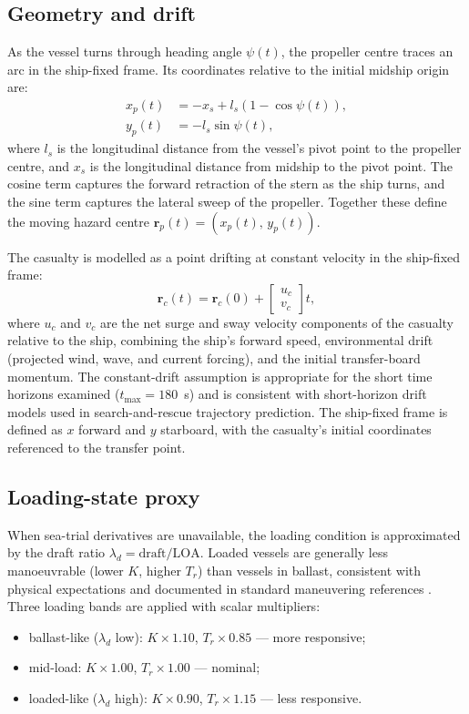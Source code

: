 \documentclass[preprint,12pt]{elsarticle}
\begin{document}
\subsection{Geometry and drift}
As the vessel turns through heading angle $\psi(t)$, the propeller centre traces an arc in the ship-fixed frame. Its coordinates relative to the initial midship origin are:
\begin{align}
 x_p(t) &= -x_s + l_s\left(1-\cos\psi(t)\right),\\
 y_p(t) &= -l_s\sin\psi(t),
\end{align}
where $l_s$ is the longitudinal distance from the vessel's pivot point to the propeller centre, and $x_s$ is the longitudinal distance from midship to the pivot point. The cosine term captures the forward retraction of the stern as the ship turns, and the sine term captures the lateral sweep of the propeller. Together these define the moving hazard centre $\mathbf{r}_p(t)=(x_p(t),\,y_p(t))$.

The casualty is modelled as a point drifting at constant velocity in the ship-fixed frame:
\begin{equation}
\mathbf{r}_c(t)=\mathbf{r}_c(0)+\begin{bmatrix}u_c\\v_c\end{bmatrix}t,
\end{equation}
where $u_c$ and $v_c$ are the net surge and sway velocity components of the casualty relative to the ship, combining the ship's forward speed, environmental drift (projected wind, wave, and current forcing), and the initial transfer-board momentum. The constant-drift assumption is appropriate for the short time horizons examined ($t_{\max}=180$~s) and is consistent with short-horizon drift models used in search-and-rescue trajectory prediction. The ship-fixed frame is defined as $x$ forward and $y$ starboard, with the casualty's initial coordinates referenced to the transfer point.

\subsection{Loading-state proxy}
When sea-trial derivatives are unavailable, the loading condition is approximated by the draft ratio $\lambda_d=\mathrm{draft}/\mathrm{LOA}$. Loaded vessels are generally less manoeuvrable (lower $K$, higher $T_r$) than vessels in ballast, consistent with physical expectations and documented in standard maneuvering references \cite{ref_fossen}. Three loading bands are applied with scalar multipliers:
\begin{itemize}
    \item ballast-like ($\lambda_d$ low): $K\times1.10$, $T_r\times0.85$ --- more responsive;
    \item mid-load: $K\times1.00$, $T_r\times1.00$ --- nominal;
    \item loaded-like ($\lambda_d$ high): $K\times0.90$, $T_r\times1.15$ --- less responsive.
\end{itemize}
\end{document}
